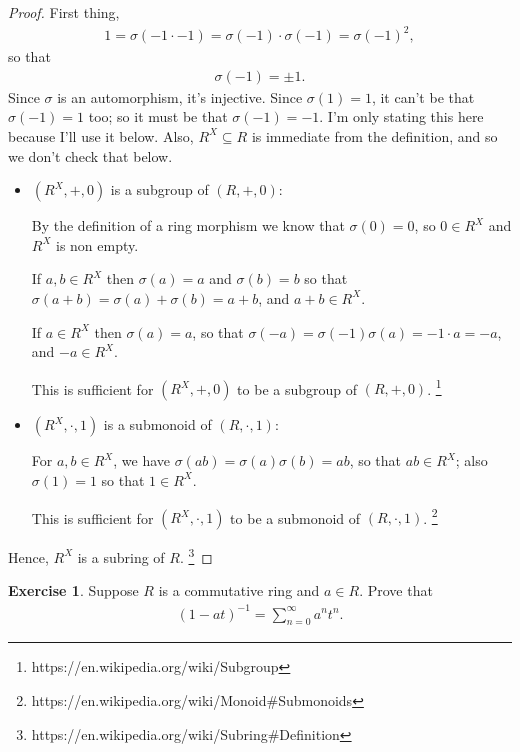 \documentclass[12pt]{extarticle}
\newcommand{\<}{\langle}
\renewcommand{\>}{\rangle}
\theoremstyle{definition}
\newtheorem{exercise}{Exercise}
\begin{document}
\begin{proof}
  First thing,
  \begin{align*}
    1 = \sigma(-1 \cdot -1) = \sigma(-1) \cdot \sigma(-1) = \sigma(-1)^2,
  \end{align*}
  so that
  \begin{align*}
    \sigma(-1) = \pm 1.
  \end{align*}
  Since $\sigma$ is an automorphism, it's injective. Since $\sigma(1) = 1$, it can't be that $\sigma(-1)=1$ too; so it must be that $\sigma(-1)=-1$. I'm only stating this here because I'll use it below. Also, $R^X \subseteq R$ is immediate from the definition, and so we don't check that below.
  
  \begin{itemize}
  \item
    $(R^X, +, 0)$ is a subgroup of $(R,+,0)$:

    By the definition of a ring morphism we know that $\sigma(0)=0$, so $0 \in R^X$ and $R^X$ is non empty. 

    If $a,b \in R^X$ then $\sigma(a)=a$ and $\sigma(b)=b$ so that $\sigma(a+b) = \sigma(a) + \sigma(b) = a + b$, and $a+b \in R^X$.

    If $a \in R^X$ then $\sigma(a)=a$, so that $\sigma(-a) = \sigma(-1)\sigma(a) = -1 \cdot a = -a$, and $-a \in R^X$.

    This is sufficient for $(R^X,+,0)$ to be a subgroup of $(R,+,0)$. \footnote{https://en.wikipedia.org/wiki/Subgroup}
  \item
    $(R^X, \cdot, 1)$ is a submonoid of $(R,\cdot,1)$:

    For $a,b \in R^X$, we have $\sigma(ab) = \sigma(a)\sigma(b) = ab$, so that $ab \in R^X$; also $\sigma(1) = 1$ so that $1 \in R^X$.

    This is sufficient for $(R^X,\cdot,1)$ to be a submonoid of $(R,\cdot,1)$. \footnote{https://en.wikipedia.org/wiki/Monoid#Submonoids}
  \end{itemize}
  Hence, $R^X$ is a subring of $R$. \footnote{https://en.wikipedia.org/wiki/Subring#Definition}

\end{proof}
\begin{exercise}
  Suppose $R$ is a commutative ring and $a \in R$. Prove that
  \begin{align*}
    (1-at)^{-1} = \sum\limits_{n=0}^{\infty} a^n t^n.
  \end{align*}
\end{exercise}
\end{document}
